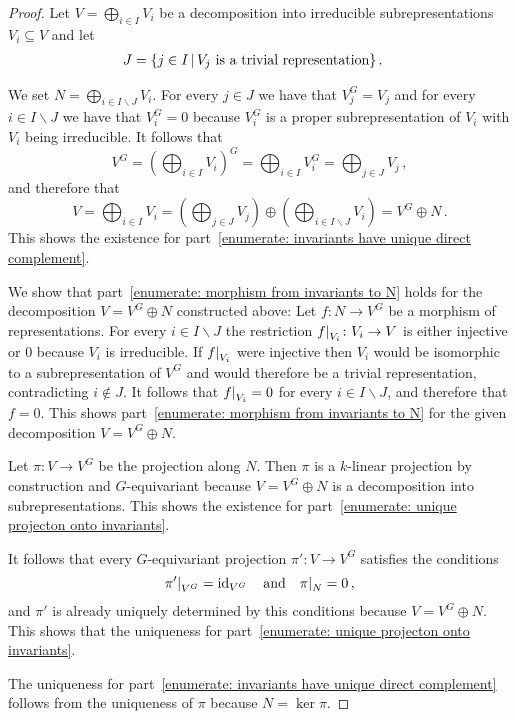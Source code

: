 \begin{proof}
  Let $V = \bigoplus_{i \in I} V_i$ be a decomposition into irreducible subrepresentations $V_i \subseteq V$ and let
  \begin{align*}
        J
    &=  \{
          j \in I
        \suchthat
          \text{$V_j$ is a trivial representation}
        \} \,.
  \end{align*}
  
  We set $N = \bigoplus_{i \in I \smallsetminus J} V_i$.
  For every $j \in J$ we have that $V_j^G = V_j$ and for every $i \in I \smallsetminus J$ we have that $V_i^G = 0$ because $V_i^G$ is a proper subrepresentation of $V_i$ with $V_i$ being irreducible.
  It follows that
  \[
      V^G
    = \left( \bigoplus_{i \in I} V_i \right)^G
    = \bigoplus_{i \in I} V_i^G
    = \bigoplus_{j \in J} V_j \,,
  \]
  and therefore that
  \[
      V
    = \bigoplus_{i \in I} V_i
    = \left( \bigoplus_{j \in J} V_j \right)
      \oplus
      \left( \bigoplus_{i \in I \smallsetminus J} V_i \right)
    = V^G \oplus N \,.
  \]
  This shows the existence for part~\ref*{enumerate: invariants have unique direct complement}.
  
  We show that part~\ref*{enumerate: morphism from invariants to N} holds for the decomposition $V = V^G \oplus N$ constructed above:
  Let $f \colon N \to V^G$ be a morphism of representations.
  For every $i \in I \smallsetminus J$ the restriction $\restrict{f}{V_i} \colon V_i \to V$ is either injective or $0$ because $V_i$ is irreducible.
  If $\restrict{f}{V_i}$ were injective then $V_i$ would be isomorphic to a subrepresentation of $V^G$ and would therefore be a trivial representation, contradicting $i \notin J$.
  It follows that $\restrict{f}{V_i} = 0$ for every $i \in I \smallsetminus J$, and therefore that $f = 0$.
  This shows part~\ref*{enumerate: morphism from invariants to N} for the given decomposition $V = V^G \oplus N$.
  
  Let $\pi \colon V \to V^G$ be the projection along $N$.
  Then $\pi$ is a $k$-linear projection by construction and $G$-equivariant because $V = V^G \oplus N$ is a decomposition into subrepresentations.
  This shows the existence for part~\ref*{enumerate: unique projecton onto invariants}.
  
  It follows that every $G$-equivariant projection $\pi' \colon V \to V^G$ satisfies the conditions
  \[
      \restrict{\pi'}{V^G}
    = \id_{V^G}
    \quad\text{and}\quad
      \restrict{\pi}{N}
    = 0 \,,
  \]
  and $\pi'$ is already uniquely determined by this conditions because $V = V^G \oplus N$.
  This shows that the uniqueness for part~\ref*{enumerate: unique projecton onto invariants}.
  
  The uniqueness for part~\ref*{enumerate: invariants have unique direct complement} follows from the uniqueness of $\pi$ because $N = \ker \pi$.
\end{proof}


